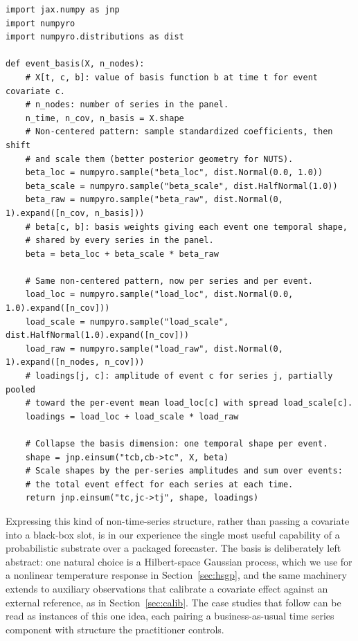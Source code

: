 \documentclass[11pt,3p,review,authoryear]{elsarticle}
\begin{document}
\begin{lstlisting}[float=!tbp,caption={A covariate-effect basis with a temporal shape shared across the panel and partially pooled, non-centered per-series loadings.},label={lst:event}]
import jax.numpy as jnp
import numpyro
import numpyro.distributions as dist

def event_basis(X, n_nodes):
    # X[t, c, b]: value of basis function b at time t for event covariate c.
    # n_nodes: number of series in the panel.
    n_time, n_cov, n_basis = X.shape
    # Non-centered pattern: sample standardized coefficients, then shift
    # and scale them (better posterior geometry for NUTS).
    beta_loc = numpyro.sample("beta_loc", dist.Normal(0.0, 1.0))
    beta_scale = numpyro.sample("beta_scale", dist.HalfNormal(1.0))
    beta_raw = numpyro.sample("beta_raw", dist.Normal(0, 1).expand([n_cov, n_basis]))
    # beta[c, b]: basis weights giving each event one temporal shape,
    # shared by every series in the panel.
    beta = beta_loc + beta_scale * beta_raw

    # Same non-centered pattern, now per series and per event.
    load_loc = numpyro.sample("load_loc", dist.Normal(0.0, 1.0).expand([n_cov]))
    load_scale = numpyro.sample("load_scale", dist.HalfNormal(1.0).expand([n_cov]))
    load_raw = numpyro.sample("load_raw", dist.Normal(0, 1).expand([n_nodes, n_cov]))
    # loadings[j, c]: amplitude of event c for series j, partially pooled
    # toward the per-event mean load_loc[c] with spread load_scale[c].
    loadings = load_loc + load_scale * load_raw

    # Collapse the basis dimension: one temporal shape per event.
    shape = jnp.einsum("tcb,cb->tc", X, beta)
    # Scale shapes by the per-series amplitudes and sum over events:
    # the total event effect for each series at each time.
    return jnp.einsum("tc,jc->tj", shape, loadings)
\end{lstlisting}

Expressing this kind of non-time-series structure, rather than passing a covariate into a black-box slot, is in our experience the single most useful capability of a probabilistic substrate over a packaged forecaster. The basis is deliberately left abstract: one natural choice is a Hilbert-space Gaussian process, which we use for a nonlinear temperature response in Section~\ref{sec:hsgp}, and the same machinery extends to auxiliary observations that calibrate a covariate effect against an external reference, as in Section~\ref{sec:calib}. The case studies that follow can be read as instances of this one idea, each pairing a business-as-usual time series component with structure the practitioner controls.
\end{document}
